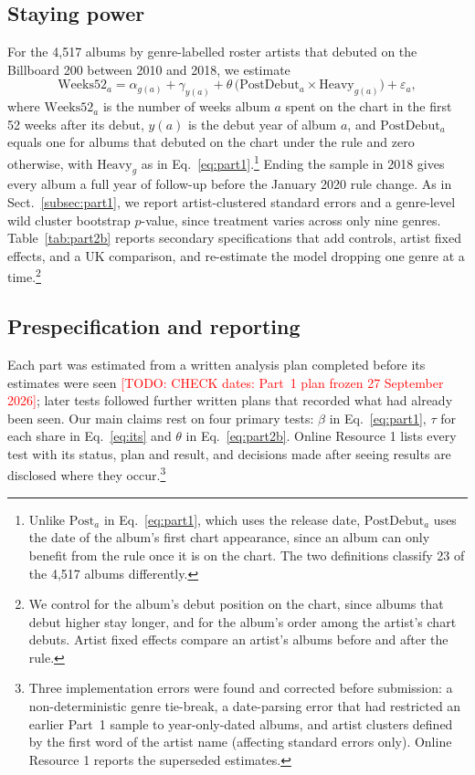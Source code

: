 \documentclass[pdflatex,sn-apa]{sn-jnl}
\newcommand{\todo}[1]{\textcolor{red}{[TODO: #1]}}
\begin{document}
\subsection{Staying power}\label{subsec:part2b}
For the 4,517 albums by genre-labelled roster artists that debuted on the Billboard 200 between 2010 and 2018, we estimate
\begin{equation}
\mathrm{Weeks52}_{a} = \alpha_{g(a)} + \gamma_{y(a)} + \theta\,\bigl(\mathrm{PostDebut}_{a}\times\mathrm{Heavy}_{g(a)}\bigr) + \varepsilon_{a},
\label{eq:part2b}
\end{equation}
where $\mathrm{Weeks52}_a$ is the number of weeks album $a$ spent on the chart in the first 52 weeks after its debut, $y(a)$ is the debut year of album $a$, and $\mathrm{PostDebut}_a$ equals one for albums that debuted on the chart under the rule and zero otherwise, with $\mathrm{Heavy}_g$ as in Eq.~\eqref{eq:part1}.\footnote{Unlike $\mathrm{Post}_a$ in Eq.~\eqref{eq:part1}, which uses the release date, $\mathrm{PostDebut}_a$ uses the date of the album's first chart appearance, since an album can only benefit from the rule once it is on the chart. The two definitions classify 23 of the 4,517 albums differently.} Ending the sample in 2018 gives every album a full year of follow-up before the January 2020 rule change. As in Sect.~\ref{subsec:part1}, we report artist-clustered standard errors and a genre-level wild cluster bootstrap $p$-value, since treatment varies across only nine genres. Table~\ref{tab:part2b} reports secondary specifications that add controls, artist fixed effects, and a UK comparison, and re-estimate the model dropping one genre at a time.\footnote{We control for the album's debut position on the chart, since albums that debut higher stay longer, and for the album's order among the artist's chart debuts. Artist fixed effects compare an artist's albums before and after the rule.}

\subsection{Prespecification and reporting}\label{subsec:prereg}
Each part was estimated from a written analysis plan completed before its estimates were seen \todo{CHECK dates: Part~1 plan frozen 27 September 2026}; later tests followed further written plans that recorded what had already been seen. Our main claims rest on four primary tests: $\beta$ in Eq.~\eqref{eq:part1}, $\tau$ for each share in Eq.~\eqref{eq:its} and $\theta$ in Eq.~\eqref{eq:part2b}. Online Resource 1 lists every test with its status, plan and result, and decisions made after seeing results are disclosed where they occur.\footnote{Three implementation errors were found and corrected before submission: a non-deterministic genre tie-break, a date-parsing error that had restricted an earlier Part~1 sample to year-only-dated albums, and artist clusters defined by the first word of the artist name (affecting standard errors only). Online Resource 1 reports the superseded estimates.}
\end{document}
